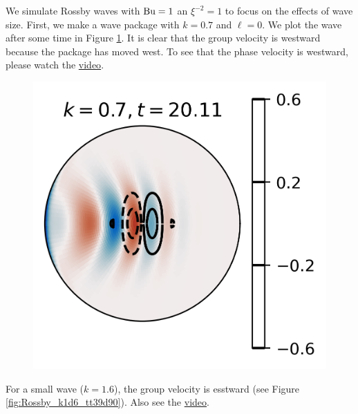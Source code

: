 We simulate Rossby waves with $\text{Bu}=1$ an $\xi^{-2}=1$ to focus on the effects of wave size. First, we make a wave package with $k=0.7$ and $\ell=0$. We plot the wave after some time in Figure \ref{fig:Rossby_k0d7_tt20d11}. It is clear that the group velocity is westward because the package has moved west. To see that the phase velocity is westward, please watch the \href{https://vimeo.com/936333986}{video}. 

\begin{figure}
    \centering
    \includegraphics{Rossby_plots/Rossby_k0d7_tt20d11}
    \caption{}
    \label{fig:Rossby_k0d7_tt20d11}
\end{figure}

For a small wave ($k=1.6$), the group velocity is esstward (see Figure \ref{fig:Rossby_k1d6_tt39d90}). Also see the \href{https://vimeo.com/936333886}{video}. 

